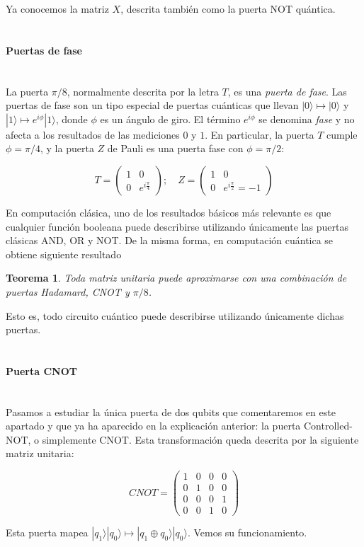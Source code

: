 \documentclass[11pt]{article}
\newcommand{\ra}{\rangle}
\newcommand{\myparagraph}[1]{\paragraph*{ \\ #1}\mbox{}\\}
\theoremstyle{plain}
\newtheorem*{theorem*}{Teorema}
\begin{document}
Ya conocemos la matriz $X$, descrita también como la puerta NOT quántica. \\


\myparagraph{Puertas de fase}


La puerta $\pi/8$, normalmente descrita por la letra $T$, es una \emph{puerta de fase}. Las puertas de fase son un tipo especial de puertas cuánticas que llevan $|0\ra \mapsto |0\ra$ y $|1\ra \mapsto e^{i\phi}|1\ra$, donde $\phi$ es un ángulo de giro. El término $e^{i\phi}$ se denomina \emph{fase} y no afecta a los resultados de las mediciones $0$ y $1$. En particular, la puerta $T$ cumple $\phi = \pi/4$, y la puerta $Z$ de Pauli es una puerta fase con $\phi = \pi/2$:

\[
	T =
	\begin{pmatrix}
		1 & 0 \\
		0 & e^{i\frac{\pi}{4}}
	\end{pmatrix}; \quad
	Z =
	\begin{pmatrix}
		1 & 0 \\
		0 & e^{i\frac{\pi}{2}} = -1
	\end{pmatrix}
\]

En computación clásica, uno de los resultados básicos más relevante es que cualquier función booleana puede describirse utilizando únicamente las puertas clásicas AND, OR y NOT. De la misma forma, en computación cuántica se obtiene siguiente resultado

\begin{theorem*}
	Toda matriz unitaria puede aproximarse con una combinación de puertas Hadamard, CNOT y $\pi/8$.
\end{theorem*}

Esto es, todo circuito cuántico puede describirse utilizando únicamente dichas puertas.


\myparagraph{Puerta CNOT}


Pasamos a estudiar la única puerta de dos qubits que comentaremos en este apartado y que ya ha aparecido en la explicación anterior: la puerta Controlled-NOT, o simplemente CNOT. Esta transformación queda descrita por la siguiente matriz unitaria:

\[
	CNOT =
	\begin{pmatrix}
	1 & 0 & 0 & 0 \\
	0 & 1 & 0 & 0 \\
	0 & 0 & 0 & 1 \\
	0 & 0 & 1 & 0
	\end{pmatrix}
\]

Esta puerta mapea $|q_1\ra|q_0\ra \mapsto |q_1 \oplus q_0\ra|q_0\ra$. Vemos su funcionamiento.
\end{document}
